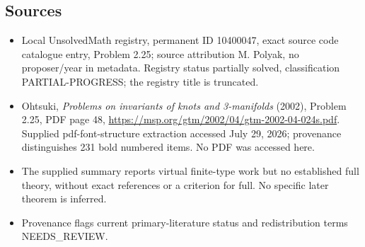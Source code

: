 \documentclass[11pt]{article}
\begin{document}
\subsection{Sources}
\begin{itemize}
\item Local UnsolvedMath registry, permanent ID 10400047, exact source code catalogue entry, Problem 2.25; source attribution M. Polyak, no proposer/year in metadata. Registry status partially solved, classification PARTIAL-PROGRESS; the registry title is truncated.
\item Ohtsuki, \emph{Problems on invariants of knots and 3-manifolds} (2002), Problem 2.25, PDF page 48, \url{https://msp.org/gtm/2002/04/gtm-2002-04-024s.pdf}. Supplied pdf-font-structure extraction accessed July 29, 2026; provenance distinguishes 231 bold numbered items. No PDF was accessed here.
\item The supplied summary reports virtual finite-type work but no established full theory, without exact references or a criterion for full. No specific later theorem is inferred.
\item Provenance flags current primary-literature status and redistribution terms NEEDS\_REVIEW.
\end{itemize}
\end{document}
